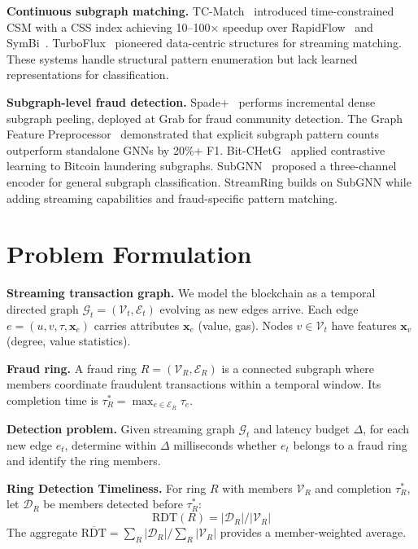 \documentclass[sigconf, anonymous, review]{acmart}
\begin{document}
\textbf{Continuous subgraph matching.} TC-Match~\cite{tcmatch2024} introduced time-constrained CSM with a CSS index achieving 10--100$\times$ speedup over RapidFlow~\cite{rapidflow2022} and SymBi~\cite{symbi2021}. TurboFlux~\cite{turboflux2018} pioneered data-centric structures for streaming matching. These systems handle structural pattern enumeration but lack learned representations for classification.

\textbf{Subgraph-level fraud detection.} Spade+~\cite{spade2024} performs incremental dense subgraph peeling, deployed at Grab for fraud community detection. The Graph Feature Preprocessor~\cite{ibmgfp2024} demonstrated that explicit subgraph pattern counts outperform standalone GNNs by 20\%+ F1. Bit-CHetG~\cite{bitchetg2024} applied contrastive learning to Bitcoin laundering subgraphs. SubGNN~\cite{subgnn2020} proposed a three-channel encoder for general subgraph classification. StreamRing builds on SubGNN while adding streaming capabilities and fraud-specific pattern matching.

\section{Problem Formulation}
\label{sec:problem}

\textbf{Streaming transaction graph.} We model the blockchain as a temporal directed graph $\mathcal{G}_t = (\mathcal{V}_t, \mathcal{E}_t)$ evolving as new edges arrive. Each edge $e = (u, v, \tau, \mathbf{x}_e)$ carries attributes $\mathbf{x}_e$ (value, gas). Nodes $v \in \mathcal{V}_t$ have features $\mathbf{x}_v$ (degree, value statistics).

\textbf{Fraud ring.} A fraud ring $R = (\mathcal{V}_R, \mathcal{E}_R)$ is a connected subgraph where members coordinate fraudulent transactions within a temporal window. Its completion time is $\tau^*_R = \max_{e \in \mathcal{E}_R} \tau_e$.

\textbf{Detection problem.} Given streaming graph $\mathcal{G}_t$ and latency budget $\Delta$, for each new edge $e_t$, determine within $\Delta$ milliseconds whether $e_t$ belongs to a fraud ring and identify the ring members.

\textbf{Ring Detection Timeliness.} For ring $R$ with members $\mathcal{V}_R$ and completion $\tau^*_R$, let $\mathcal{D}_R$ be members detected before $\tau^*_R$:
\begin{equation}
    \text{RDT}(R) = |\mathcal{D}_R| / |\mathcal{V}_R|
\end{equation}
The aggregate $\overline{\text{RDT}} = \sum_R |\mathcal{D}_R| / \sum_R |\mathcal{V}_R|$ provides a member-weighted average.
\end{document}
